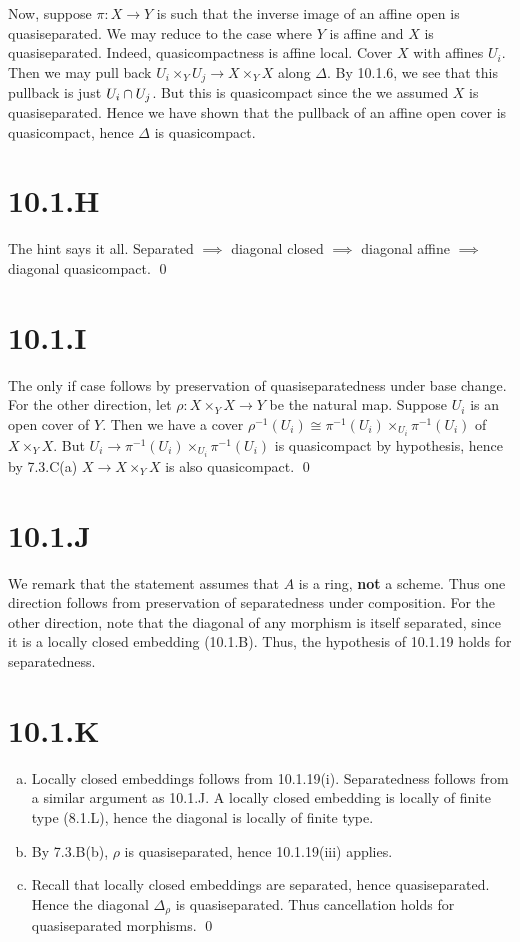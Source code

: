 \documentclass{article}
\begin{document}
Now, suppose $\pi: X \to Y$ is such that the inverse image of an affine
open is quasiseparated. We may reduce to the case where $Y$
is affine and $X$ is quasiseparated. Indeed,
quasicompactness is affine local. Cover $X$ with affines
$U_i$. Then we may pull back $U_i \times_Y U_j \to X \times_Y X$ along
$\Delta$. By 10.1.6, we see that this pullback is just
$U_i \cap U_j$. But this is quasicompact since the we assumed
$X$ is quasiseparated. Hence we have shown that the pullback
of an affine open cover is quasicompact, hence $\Delta$ is
quasicompact.

\section{10.1.H}
The hint says it all. Separated $\implies$ diagonal closed
$\implies$ diagonal affine $\implies$ diagonal
quasicompact. \qed

\section{10.1.I}
The only if case follows by preservation of quasiseparatedness under base
change. For the other direction, let $\rho: X\times_YX \to Y$ be the natural map.
Suppose $U_i$ is an open cover of $Y$. Then
we have a cover $\rho^{-1}(U_i) \cong \pi^{-1}(U_i) \times_{U_i}
    \pi^{-1}(U_i)$ of $X \times_Y X$. But
$U_i \to \pi^{-1}(U_i) \times_{U_i} \pi^{-1}(U_i)$ is quasicompact by hypothesis, hence by 7.3.C(a)
$X \to X\times_YX$ is also quasicompact. \qed

\section{10.1.J}
We remark that the statement assumes that $A$ is a ring,
\textbf{not} a scheme. Thus one direction follows from preservation
of separatedness under composition. For the other direction, note that the
diagonal of any morphism is itself separated, since it is a locally closed
embedding (10.1.B). Thus, the hypothesis of 10.1.19 holds for separatedness.

\section{10.1.K}
\begin{enumerate}[a.]
    \item Locally closed embeddings follows from 10.1.19(i). Separatedness follows from a
          similar argument as 10.1.J. A locally closed embedding is locally of finite
          type (8.1.L), hence the diagonal is locally of finite type.
    \item By 7.3.B(b), $\rho$ is quasiseparated, hence 10.1.19(iii)
          applies.
    \item Recall that locally closed embeddings are separated, hence quasiseparated.
          Hence the diagonal $\Delta_{\rho}$ is quasiseparated. Thus cancellation
          holds for quasiseparated morphisms. \qed
\end{enumerate}
\end{document}
